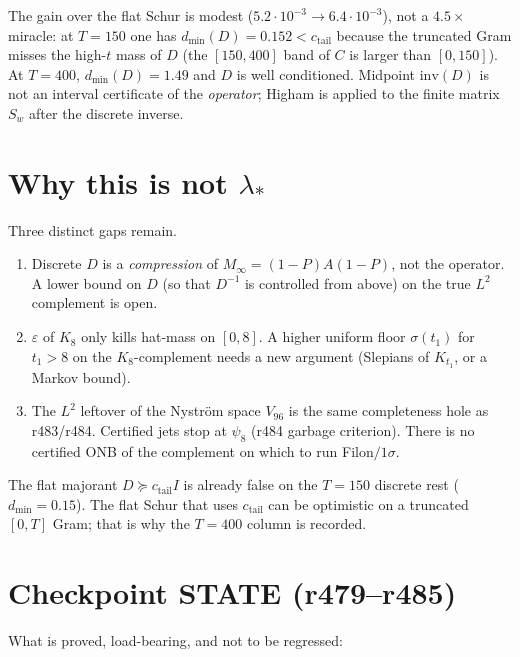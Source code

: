 \documentclass[11pt]{article}
\theoremstyle{remark}
\newcommand{\Minf}{M_{\infty}}
\begin{document}
The gain over the flat Schur is modest
($5.2\cdot10^{-3}\to6.4\cdot10^{-3}$), not a
$4.5\times$ miracle: at $T=150$ one has
$d_{\min}(D)=0.152<c_{\mathrm{tail}}$
because the truncated Gram misses the high-$t$ mass of
$D$ (the $[150,400]$ band of $C$ is larger than
$[0,150]$).
At $T=400$, $d_{\min}(D)=1.49$ and $D$ is well
conditioned.
Midpoint $\mathrm{inv}(D)$ is not an interval
certificate of the \emph{operator}; Higham is applied
to the finite matrix $S_w$ after the discrete inverse.

\section{Why this is not $\lambda_*$}

Three distinct gaps remain.

\begin{enumerate}
\item Discrete $D$ is a \emph{compression} of
$\Minf=(1-P)A(1-P)$, not the operator.
A lower bound on $D$ (so that $D^{-1}$ is controlled
from above) on the true $L^2$ complement is open.
\item $\varepsilon$ of $K_8$ only kills hat-mass on
$[0,8]$.  A higher uniform floor $\sigma(t_1)$ for
$t_1>8$ on the $K_8$-complement needs a new argument
(Slepians of $K_{t_1}$, or a Markov bound).
\item The $L^2$ leftover of the Nystr\"om space $V_{96}$
is the same completeness hole as r483/r484.
Certified jets stop at $\psi_8$ (r484 garbage
criterion).  There is no certified ONB of the complement
on which to run Filon$/1\sigma$.
\end{enumerate}

The flat majorant $D\succeq c_{\mathrm{tail}}I$ is
already false on the $T=150$ discrete rest
($d_{\min}=0.15$).
The flat Schur that uses $c_{\mathrm{tail}}$ can be
optimistic on a truncated $[0,T]$ Gram; that is why
the $T=400$ column is recorded.

\section{Checkpoint STATE (r479--r485)}

What is proved, load-bearing, and not to be regressed:
\end{document}
